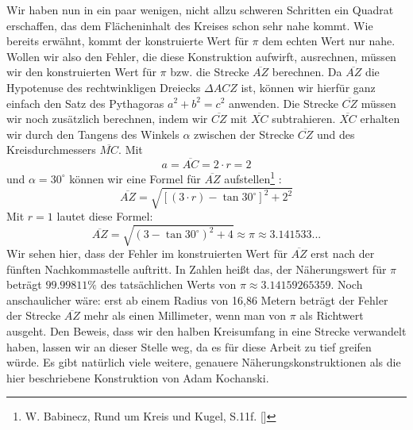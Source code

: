 \documentclass[11pt]{article}
\begin{document}
Wir haben nun in ein paar wenigen, nicht allzu schweren Schritten ein Quadrat erschaffen, das dem 
Flächeninhalt des Kreises schon sehr nahe kommt. Wie bereits erwähnt, kommt der konstruierte Wert für 
\(\pi\) dem echten Wert nur nahe. Wollen wir also den Fehler, die diese Konstruktion aufwirft, ausrechnen, 
müssen wir den konstruierten Wert für \(\pi\) bzw. die Strecke \(\overline{AZ}\) berechnen. Da 
\(\overline{AZ}\) die Hypotenuse des rechtwinkligen Dreiecks \(\Delta ACZ\) ist, können 
wir hierfür ganz einfach den Satz des Pythagoras $a^2 + b^2 = c^2$ anwenden. Die Strecke 
\(\overline{CZ}\) müssen wir noch zusätzlich berechnen, indem wir \(\overline{CZ}\) mit 
\(\overline{XC}\) subtrahieren. \(\overline{XC}\) erhalten wir durch den Tangens des 
Winkels \(\alpha\) zwischen der Strecke \(\overline{CZ}\) und des Kreisdurchmessers 
\(\overline{MC}\).   Mit \[a=\overline{AC}=2\cdot r=2\] und \(\alpha = 30^{\circ}\) können wir eine 
Formel für \(\overline{AZ}\) aufstellen\footnote{W. Babinecz, Rund um Kreis und Kugel, S.11f. 
[\BabineczInt]} : \[\overline{AZ}=\sqrt{\left[(3\cdot r)-\tan{30^{\circ}}\right]^2+2^2}\] Mit \(r=1\)
lautet diese Formel: 
\[
\overline{AZ}=\sqrt{(3-\tan{30^{\circ}})^2+4}\approx \pi \approx 3.141533...
\]
 Wir sehen hier, dass der Fehler im konstruierten Wert für \(\overline{AZ}\) erst nach der fünften Nachkommastelle auftritt. In Zahlen heißt das, der Näherungswert für \(\pi\) beträgt \(99.99811\%\) des tatsächlichen Werts von \(\pi \approx 3.14159265359\). Noch anschaulicher wäre: erst ab einem Radius von 16,86 Metern beträgt der Fehler der Strecke \(\overline{AZ}\) mehr als einen Millimeter, wenn man von \(\pi\) als Richtwert ausgeht. Den Beweis, dass wir den halben Kreisumfang in eine Strecke verwandelt haben, lassen wir an dieser Stelle weg, da es für diese Arbeit zu tief greifen würde. Es gibt natürlich viele weitere, genauere Näherungskonstruktionen als die hier beschriebene Konstruktion von Adam Kochanski.\par
 \newpage
\end{document}
